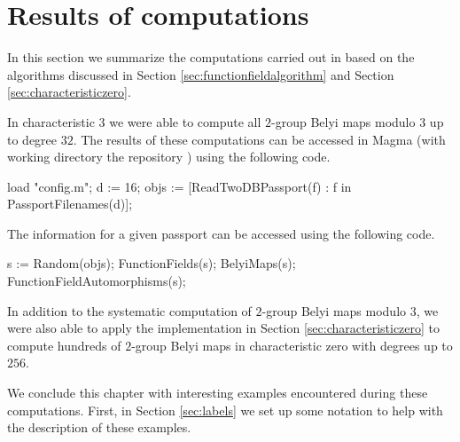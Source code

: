 \documentclass{dcthesis}
\numberwithin{equation}{section}
\theoremstyle{definition}
\theoremstyle{remark}
\begin{document}
{{  \section{Results of computations}{
    \label{sec:resultsequations}
    In this section we summarize
    the computations carried
    out in \cite{twogroupdessins}
    based on the algorithms
    discussed in Section
    \ref{sec:functionfieldalgorithm}
    and
    Section
    \ref{sec:characteristiczero}.
    \par
    In characteristic $3$
    we were able to compute
    all $2$-group Belyi maps modulo $3$
    up to degree $32$.
    The results of these computations can
    be accessed in \textsf{Magma}
    (with working directory the
    repository \cite{twogroupdessins})
    using
    the following code.
    \begin{magma}
load "config.m";
d := 16;
objs := [ReadTwoDBPassport(f) : f in PassportFilenames(d)];
    \end{magma}
    The information for a given passport can
    be accessed using the following code.
    \begin{magma}
s := Random(objs);
FunctionFields(s);
BelyiMaps(s);
FunctionFieldAutomorphisms(s);
    \end{magma}
    In addition to the systematic
    computation of $2$-group
    Belyi maps modulo $3$,
    we were also able to apply the
    implementation in
    Section
    \ref{sec:characteristiczero}
    to compute hundreds
    of $2$-group Belyi maps
    in characteristic zero
    with degrees up to $256$.
    \par
    We conclude this chapter
    with interesting examples
    encountered during these computations.
    First,
    in Section
    \ref{sec:labels}
    we set up some notation to
    help with the description of these
    examples.
  }
}}
\end{document}
